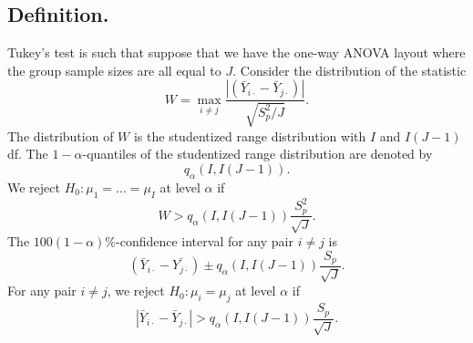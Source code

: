 \documentclass[titlepage]{article}
\begin{document}
\subsection{Definition.} Tukey's test is such that suppose that we have the one-way ANOVA layout where the group sample sizes are all equal to $J$. Consider the distribution of the statistic 
$$W = \max_{i \neq j}\frac{|(\bar{Y}_{i\cdot} - \bar{Y}_{j\cdot})|}{\sqrt{S_{p}^{2}/J}}.$$
The distribution of $W$ is the studentized range distribution with $I$ and $I(J-1)$ df. The $1-\alpha$-quantiles of the studentized range distribution are denoted by 
$$q_{\alpha}(I, I(J-1)).$$
We reject $H_{0}: \mu_{1} = \ldots = \mu_{I}$ at level $\alpha$ if 
$$W > q_{\alpha}(I, I(J-1))\frac{S_{p}^{2}}{\sqrt{J}}.$$
The $100(1-\alpha)\%$-confidence interval for any pair $i \neq j$ is 
$$(\bar{Y}_{i\cdot} - \bar{Y_{j\cdot}}) \pm q_{\alpha}(I, I(J-1))\frac{S_{p}}{\sqrt{J}}.$$
For any pair $i \neq j$, we reject $H_{0}: \mu_{i} = \mu_{j}$ at level $\alpha$ if
$$|\bar{Y}_{i\cdot} - \bar{Y}_{j\cdot}| > q_{\alpha}(I, I(J-1))\frac{S_{p}}{\sqrt{J}}.$$
\end{document}
